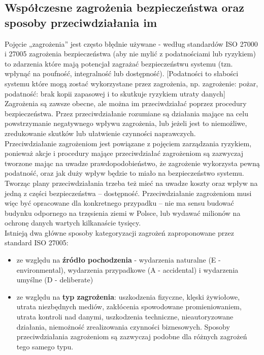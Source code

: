 \subsection{Współczesne zagrożenia bezpieczeństwa oraz sposoby przeciwdziałania im}

Pojęcie „zagrożenia” jest często błędnie używane - według standardów ISO 27000 i 27005 zagrożenia bezpieczeństwa (aby nie mylić z podatnościami lub ryzykiem) to zdarzenia które mają potencjał zagrażać bezpieczeństwu systemu (tzn. wpłynąć na poufność, integralność lub dostępność). [Podatności to słabości systemu które mogą zostać wykorzystane przez zagrożenia, np. zagrożenie: pożar, podatność: brak kopii zapasowej i to skutkuje ryzykiem utraty danych] \\

Zagrożenia są zawsze obecne, ale można im przeciwdziałać poprzez procedury bezpieczeństwa. Przez przeciwdziałanie rozumiane są działania mające na celu powstrzymanie negatywnego wpływu zagrożenia, lub jeżeli jest to niemożliwe, zredukowanie skutków lub ułatwienie czynności naprawczych. \\

Przeciwdziałanie zagrożeniom jest powiązane z pojęciem zarządzania ryzykiem, ponieważ akcje i procedury mające przeciwdziałać zagrożeniom są zazwyczaj tworzone mając na uwadze prawdopodobieństwo, że zagrożenie wykorzysta pewną podatność, oraz jak duży wpływ będzie to miało na bezpieczeństwo systemu. Tworząc plany przeciwdziałania trzeba też mieć na uwadze koszty oraz wpływ na jedną z części bezpieczeństwa – dostępność. Przeciwdziałanie zagrożeniom musi więc być opracowane dla konkretnego przypadku – nie ma sensu budować budynku odpornego na trzęsienia ziemi w Polsce, lub wydawać milionów na ochronę danych wartych kilkanaście tysięcy. \\

Istnieją dwa główne sposoby kategoryzacji zagrożeń zaproponowane przez standard ISO 27005:

\begin{itemize}
	\item ze względu na \textbf{źródło pochodzenia} - wydarzenia naturalne (E - environmental), wydarzenia przypadkowe (A - accidental) i wydarzenia umyślne (D - deliberate)
	\item ze względu na \textbf{typ zagrożenia}: uszkodzenia fizyczne, klęski żywiołowe, utrata niezbędnych mediów, zakłócenia spowodowane promieniowaniem, utrata kontroli nad danymi, uszkodzenia techniczne, nieautoryzowane działania, niemożność zrealizowania czynności biznesowych. Sposoby przeciwdziałania zagrożeniom są zazwyczaj podobne dla różnych zagrożeń tego samego typu.
\end{itemize}

